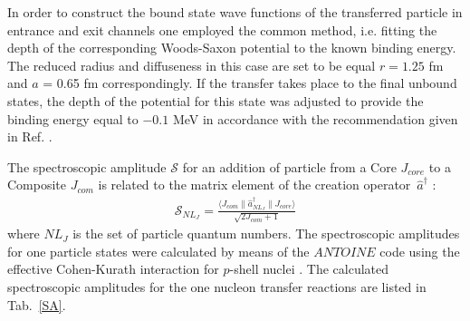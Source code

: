 \documentclass[10pt]{iopart}
\begin{document}
In order to construct the bound state wave functions of the transferred particle in entrance and exit channels one employed the common method, i.e. fitting the depth of the corresponding Woods-Saxon potential to the known binding energy. The reduced radius and diffuseness in this case are set to be equal $r = 1.25$ fm and $a$ = 0.65 fm correspondingly. If the transfer takes place to the final unbound states, the depth of the potential for this state was adjusted to provide the binding energy equal to $-0.1$ MeV in accordance with the recommendation given in Ref. \cite{harakeh1980}.


The spectroscopic amplitude  $\mathcal{S}$ for an addition of particle from a Core $J_{core}$ to a Composite $J_{com}$ is related to the matrix element of the creation operator~$\hat{a}^\dagger$ :
\begin{eqnarray}\label{eq:SA}
\mathcal{S}_{NL_J} = \frac{\langle J_{com} \| \hat{a}^\dagger _{NL_J} \| J_{core}  \rangle}{\sqrt{2J_{com}+1}}
\end{eqnarray}
where $NL_J$ is the set of particle quantum numbers. The spectroscopic amplitudes for one particle states were calculated by means of the $ANTOINE$ code \cite{antoine}  using the effective Cohen-Kurath interaction for $p$-shell nuclei \cite{cohen1965}. The calculated spectroscopic amplitudes for the one nucleon transfer reactions are listed in Tab.~\ref{SA}.
\end{document}
